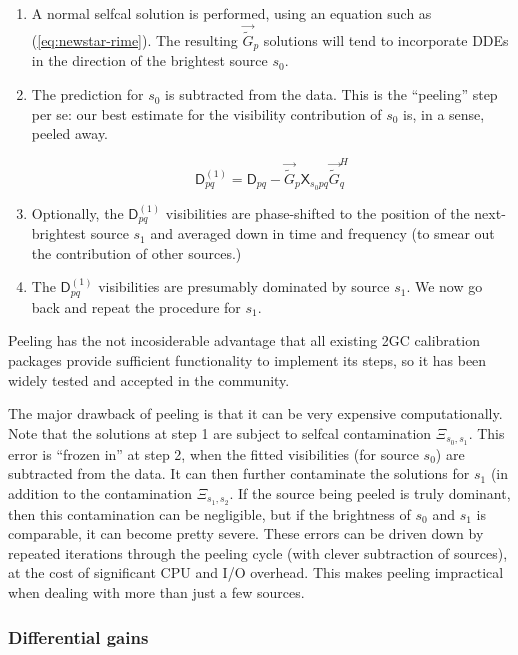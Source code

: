 \documentclass[]{aa}
\newcommand{\herm}{H}
\newcommand{\jones}[2]{\vec {#1}_{#2}}
\newcommand{\jonesT}[2]{\vec {#1}^{\herm}_{#2}}
\newcommand{\coh}[2]{\mathsf{{#1}}_{{#2}}}
\begin{document}
\begin{enumerate}

\item A normal selfcal solution is performed, using an equation such as (\ref{eq:newstar-rime}). The resulting $\jones{\tilde{G}}{p}$ solutions will tend to incorporate DDEs in the direction of the brightest source $s_0$.

\item The prediction for $s_0$ is subtracted from the data. This is the ``peeling'' step per se: our best estimate for the visibility contribution of $s_0$ is, in a sense, peeled away.

\[
\coh{D}{pq}^{(1)} = \coh{D}{pq} - \jones{\tilde{G}}{p} \coh{X}{s_0 pq} \jonesT{\tilde{G}}{q}
\]

\item Optionally, the $\coh{D}{pq}^{(1)}$ visibilities are phase-shifted to the position of the next-brightest source $s_1$ and averaged down in time and frequency (to smear out the contribution of other sources.)
 
\item The $\coh{D}{pq}^{(1)}$ visibilities are presumably dominated by source $s_1$. We now go back and repeat the procedure for $s_1$.

\end{enumerate}

Peeling has the not incosiderable advantage that all existing 2GC calibration packages provide sufficient functionality to implement its steps, so it has been widely tested and accepted in the community. 

The major drawback of peeling is that it can be very expensive computationally. Note that the solutions at step 1 are subject to selfcal contamination $\Xi_{s_0,s_1}$. This error is ``frozen in'' at step 2, when the fitted visibilities (for source $s_0$) are subtracted from the data. It can then further contaminate the solutions for $s_1$ (in addition to the contamination $\Xi_{s_1,s_2}$. If the source being peeled is truly dominant, then this contamination can be negligible, but if the brightness of $s_0$ and $s_1$ is comparable, it can become pretty severe. These errors can be driven down by repeated iterations through the peeling cycle (with clever subtraction of sources), at the cost of significant CPU and I/O overhead. This makes peeling impractical when dealing with more than just a few sources. 

\subsubsection{Differential gains}
\end{document}
